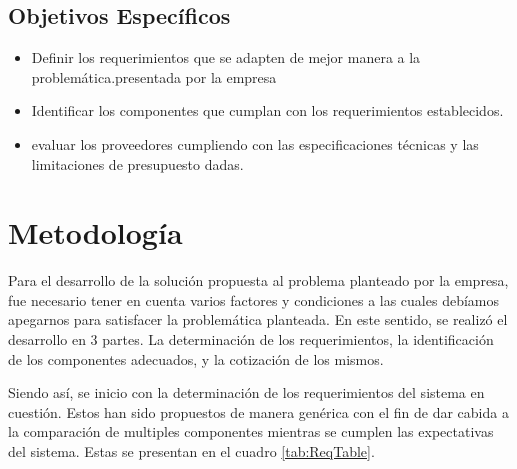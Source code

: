 \documentclass[conference,onecolumn]{IEEEtran}
\begin{document}
\subsection{Objetivos Específicos}

\begin{itemize}
    \item Definir los requerimientos que se adapten de mejor manera a la problemática.presentada por la empresa \medbreak
    \item Identificar los componentes que cumplan con los requerimientos establecidos.\medbreak
    \item evaluar los proveedores cumpliendo con las especificaciones técnicas y las limitaciones de presupuesto dadas. \medbreak
\end{itemize}

\section{Metodología}

Para el desarrollo de la solución propuesta al problema planteado por la empresa, fue necesario tener en cuenta varios factores y condiciones a las cuales debíamos apegarnos para satisfacer la problemática planteada. En este sentido, se realizó el desarrollo en 3 partes. La determinación de los requerimientos, la identificación de los componentes adecuados, y la cotización de los mismos.

Siendo así, se inicio con la determinación de los requerimientos del sistema en cuestión. Estos han sido propuestos de manera genérica con el fin de dar cabida a la comparación de multiples componentes mientras se cumplen las expectativas del sistema. Estas se presentan en el cuadro \ref{tab:ReqTable}.
\end{document}

